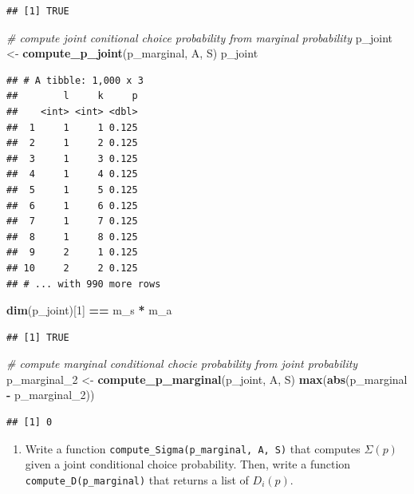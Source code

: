 \documentclass[]{book}
\newenvironment{Shaded}{\begin{snugshade}}{\end{snugshade}}
\newcommand{\KeywordTok}[1]{\textcolor[rgb]{0.13,0.29,0.53}{\textbf{#1}}}
\newcommand{\DecValTok}[1]{\textcolor[rgb]{0.00,0.00,0.81}{#1}}
\newcommand{\StringTok}[1]{\textcolor[rgb]{0.31,0.60,0.02}{#1}}
\newcommand{\CommentTok}[1]{\textcolor[rgb]{0.56,0.35,0.01}{\textit{#1}}}
\newcommand{\OperatorTok}[1]{\textcolor[rgb]{0.81,0.36,0.00}{\textbf{#1}}}
\newcommand{\NormalTok}[1]{#1}
\providecommand{\tightlist}{%
  \setlength{\itemsep}{0pt}\setlength{\parskip}{0pt}}
\begin{document}
\begin{verbatim}
## [1] TRUE
\end{verbatim}

\begin{Shaded}
\begin{Highlighting}[]
\CommentTok{# compute joint conitional choice probability from marginal probability}
\NormalTok{p_joint <-}\StringTok{ }\KeywordTok{compute_p_joint}\NormalTok{(p_marginal, A, S)}
\NormalTok{p_joint}
\end{Highlighting}
\end{Shaded}

\begin{verbatim}
## # A tibble: 1,000 x 3
##        l     k     p
##    <int> <int> <dbl>
##  1     1     1 0.125
##  2     1     2 0.125
##  3     1     3 0.125
##  4     1     4 0.125
##  5     1     5 0.125
##  6     1     6 0.125
##  7     1     7 0.125
##  8     1     8 0.125
##  9     2     1 0.125
## 10     2     2 0.125
## # ... with 990 more rows
\end{verbatim}

\begin{Shaded}
\begin{Highlighting}[]
\KeywordTok{dim}\NormalTok{(p_joint)[}\DecValTok{1}\NormalTok{] }\OperatorTok{==}\StringTok{ }\NormalTok{m_s }\OperatorTok{*}\StringTok{ }\NormalTok{m_a}
\end{Highlighting}
\end{Shaded}

\begin{verbatim}
## [1] TRUE
\end{verbatim}

\begin{Shaded}
\begin{Highlighting}[]
\CommentTok{# compute marginal conditional chocie probability from joint probability}
\NormalTok{p_marginal_}\DecValTok{2}\NormalTok{ <-}\StringTok{ }\KeywordTok{compute_p_marginal}\NormalTok{(p_joint, A, S)}
\KeywordTok{max}\NormalTok{(}\KeywordTok{abs}\NormalTok{(p_marginal }\OperatorTok{-}\StringTok{ }\NormalTok{p_marginal_}\DecValTok{2}\NormalTok{))}
\end{Highlighting}
\end{Shaded}

\begin{verbatim}
## [1] 0
\end{verbatim}

\begin{enumerate}
\def\labelenumi{\arabic{enumi}.}
\setcounter{enumi}{5}
\tightlist
\item
  Write a function \texttt{compute\_Sigma(p\_marginal,\ A,\ S)} that
  computes \(\Sigma(p)\) given a joint conditional choice probability.
  Then, write a function \texttt{compute\_D(p\_marginal)} that returns a
  list of \(D_i(p)\).
\end{enumerate}
\end{document}
